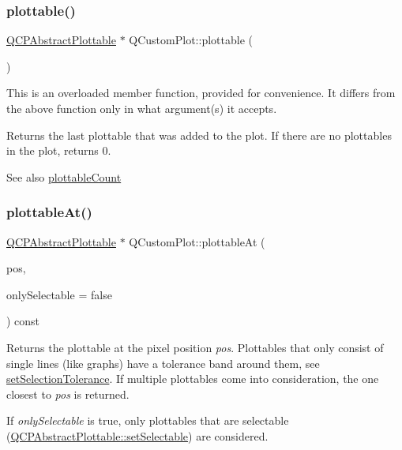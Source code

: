 \subsubsection{\texorpdfstring{plottable()}{plottable()}\hspace{0.1cm}{\footnotesize\ttfamily [2/2]}}
{\footnotesize\ttfamily \mbox{\hyperlink{class_q_c_p_abstract_plottable}{Q\+C\+P\+Abstract\+Plottable}} $\ast$ Q\+Custom\+Plot\+::plottable (\begin{DoxyParamCaption}{ }\end{DoxyParamCaption})}

This is an overloaded member function, provided for convenience. It differs from the above function only in what argument(s) it accepts.

Returns the last plottable that was added to the plot. If there are no plottables in the plot, returns 0.

\begin{DoxySeeAlso}{See also}
\mbox{\hyperlink{class_q_custom_plot_a5f4f15991c14bf9ad659bb2a19dfbed4}{plottable\+Count}} 
\end{DoxySeeAlso}
\mbox{\label{class_q_custom_plot_acddbbd8b16dd633f0d94e5a736fbd8cf}} 
\subsubsection{\texorpdfstring{plottable\+At()}{plottableAt()}}
{\footnotesize\ttfamily \mbox{\hyperlink{class_q_c_p_abstract_plottable}{Q\+C\+P\+Abstract\+Plottable}} $\ast$ Q\+Custom\+Plot\+::plottable\+At (\begin{DoxyParamCaption}\item[{const Q\+PointF \&}]{pos,  }\item[{bool}]{only\+Selectable = {\ttfamily false} }\end{DoxyParamCaption}) const}

Returns the plottable at the pixel position {\itshape pos}. Plottables that only consist of single lines (like graphs) have a tolerance band around them, see \mbox{\hyperlink{class_q_custom_plot_a4dc31241d7b09680950e19e5f971ed93}{set\+Selection\+Tolerance}}. If multiple plottables come into consideration, the one closest to {\itshape pos} is returned.

If {\itshape only\+Selectable} is true, only plottables that are selectable (\mbox{\hyperlink{class_q_c_p_abstract_plottable_ac238d6e910f976f1f30d41c2bca44ac3}{Q\+C\+P\+Abstract\+Plottable\+::set\+Selectable}}) are considered.

